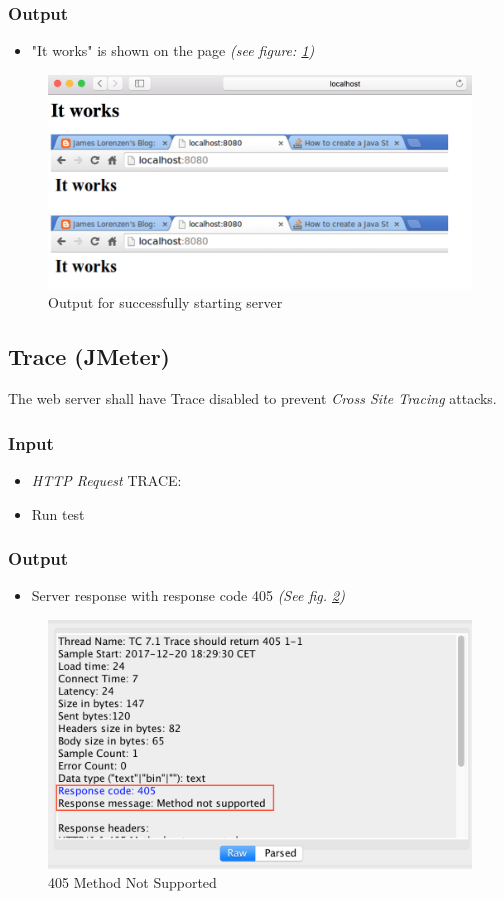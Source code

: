 \documentclass[a4paper, 12pt]{article}
\begin{document}
\subsubsection{Output}
\begin{itemize}
\item "It works" is shown on the page \textit{(see figure: \ref{TC6.1})}
\end{itemize}

\begin{figure}[H]
\centering
\includegraphics[scale=0.5]{output_clarification/TC1-1.png} 
\caption{Output for successfully starting server}
\label{TC6.1}
\end{figure}

\subsection{Trace (JMeter)}

The web server shall have Trace disabled to prevent \textit{Cross Site Tracing} attacks.

\subsubsection{Input}
\begin{itemize}
\item \textit{HTTP Request} TRACE:
\item Run test
\end{itemize}

\subsubsection{Output}
\begin{itemize}
\item Server response with response code 405 \textit{(See fig. \ref{TC7.1})}
\end{itemize}

\begin{figure}[H]
\centering
\includegraphics[scale=0.7]{output_clarification/405METHODNOTSUPORTED.png} 
\caption{405 Method Not Supported}
\label{TC7.1}
\end{figure}
\end{document}
